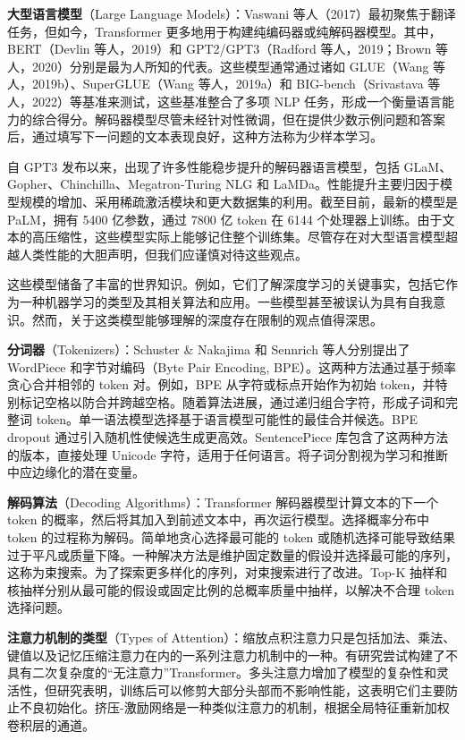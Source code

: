 \textbf{大型语言模型}（Large Language Models）：Vaswani 等人（2017）最初聚焦于翻译任务，但如今，Transformer 更多地用于构建纯编码器或纯解码器模型。其中，BERT（Devlin 等人，2019）和 GPT2/GPT3（Radford 等人，2019；Brown 等人，2020）分别是最为人所知的代表。这些模型通常通过诸如 GLUE（Wang 等人，2019b）、SuperGLUE（Wang 等人，2019a）和 BIG-bench（Srivastava 等人，2022）等基准来测试，这些基准整合了多项 NLP 任务，形成一个衡量语言能力的综合得分。解码器模型尽管未经针对性微调，但在提供少数示例问题和答案后，通过填写下一问题的文本表现良好，这种方法称为少样本学习。

自 GPT3 发布以来，出现了许多性能稳步提升的解码器语言模型，包括 GLaM、Gopher、Chinchilla、Megatron-Turing NLG 和 LaMDa。性能提升主要归因于模型规模的增加、采用稀疏激活模块和更大数据集的利用。截至目前，最新的模型是 PaLM，拥有 5400 亿参数，通过 7800 亿 token 在 6144 个处理器上训练。由于文本的高压缩性，这些模型实际上能够记住整个训练集。尽管存在对大型语言模型超越人类性能的大胆声明，但我们应谨慎对待这些观点。

这些模型储备了丰富的世界知识。例如，它们了解深度学习的关键事实，包括它作为一种机器学习的类型及其相关算法和应用。一些模型甚至被误认为具有自我意识。然而，关于这类模型能够理解的深度存在限制的观点值得深思。

\textbf{分词器}（Tokenizers）：Schuster \& Nakajima 和 Sennrich 等人分别提出了 WordPiece 和字节对编码（Byte Pair Encoding, BPE）。这两种方法通过基于频率贪心合并相邻的 token 对。例如，BPE 从字符或标点开始作为初始 token，并特别标记空格以防合并跨越空格。随着算法进展，通过递归组合字符，形成子词和完整词 token。单一语法模型选择基于语言模型可能性的最佳合并候选。BPE dropout 通过引入随机性使候选生成更高效。SentencePiece 库包含了这两种方法的版本，直接处理 Unicode 字符，适用于任何语言。将子词分割视为学习和推断中应边缘化的潜在变量。

\textbf{解码算法}（Decoding Algorithms）：Transformer 解码器模型计算文本的下一个 token 的概率，然后将其加入到前述文本中，再次运行模型。选择概率分布中 token 的过程称为解码。简单地贪心选择最可能的 token 或随机选择可能导致结果过于平凡或质量下降。一种解决方法是维护固定数量的假设并选择最可能的序列，这称为束搜索。为了探索更多样化的序列，对束搜索进行了改进。Top-K 抽样和核抽样分别从最可能的假设或固定比例的总概率质量中抽样，以解决不合理 token 选择问题。

\textbf{注意力机制的类型}（Types of Attention）：缩放点积注意力只是包括加法、乘法、键值以及记忆压缩注意力在内的一系列注意力机制中的一种。有研究尝试构建了不具有二次复杂度的“无注意力”Transformer。多头注意力增加了模型的复杂性和灵活性，但研究表明，训练后可以修剪大部分头部而不影响性能，这表明它们主要防止不良初始化。挤压-激励网络是一种类似注意力的机制，根据全局特征重新加权卷积层的通道。

